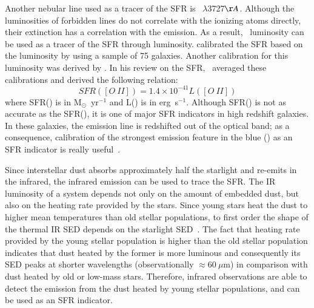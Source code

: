 Another nebular line used as a tracer of the SFR is \oii~$\lambda$3727$\AA$. %
Although the luminosities of forbidden lines do not correlate with the ionizing atoms directly, their extinction has a correlation with the \halpha emission. 
As a result, \oii~luminosity can be used as a tracer of the SFR through \halpha luminosity. %
\cite{Gallagher89} calibrated the SFR based on the \oii luminosity by using a sample of 75 galaxies. 
Another calibration for this luminosity was derived by \cite{Kennicutt92}. 
In his review on the SFR,~\citep{Kennicutt98b} averaged these calibrations and derived the following relation:
\begin{equation}
SFR([O\ II]) = 1.4 \times 10^{-41} L([O\ II])
\end{equation}  
where SFR(\oii) is in M$_{\odot}$~yr$^{-1}$ and L(\halpha) is in erg~s$^{-1}$. %
Although SFR(\oii) is not as accurate as the SFR(\halpha), it is one of major SFR indicators in high redshift galaxies.
In these galaxies, the \halpha emission line is redshifted out of the optical band; as a consequence, calibration of the strongest emission feature in the blue (\oii) as an SFR indicator is really useful~\citep{Kennicutt98b}.


Since interstellar dust absorbs approximately half the starlight and re-emits in the infrared, the infrared emission can be used to trace the SFR.
The IR luminosity of a system depends not only on the amount of embedded dust, but also on the heating rate provided by the stars. 
Since young stars heat the dust to higher mean temperatures than old stellar populations, to first order the shape of the thermal IR SED depends on the starlight SED~\citep{Helou86}.
The fact that heating rate provided by the young stellar population is higher than the old stellar population indicates that dust heated by the former is more luminous and consequently its SED peaks at shorter wavelengths (observationally $\approx 60~\mu$m) in comparison with dust heated by old or low-mass stars.
Therefore, infrared observations are able to detect the emission from the dust heated by young stellar populations, and can be used as an SFR indicator.  


